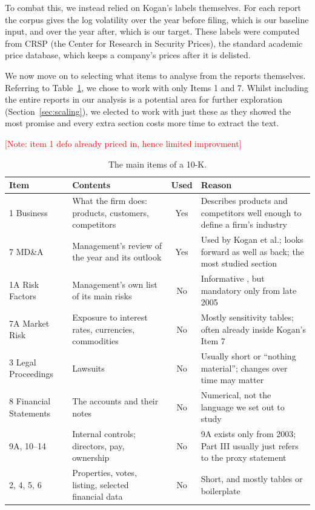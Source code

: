 \documentclass[11pt,a4paper]{article}
\newcommand{\placeholder}[1]{\textcolor{red}{[#1]}}
\begin{document}
To combat this, we instead relied on Kogan's labels themselves. For each report the corpus gives the log volatility over the year before filing, which is our baseline input, and over the year after, which is our target. These labels were computed from CRSP (the Center for Research in Security Prices), the standard academic price database, which keeps a company's prices after it is delisted.

We now move on to selecting what items to analyse from the reports themselves. Referring to Table~\ref{tab:items}, we chose to work with only Items 1 and 7. Whilst including the entire reports in our analysis is a potential area for further exploration (Section~\ref{sec:scaling}), we elected to work with just these as they showed the most promise and every extra section costs more time to extract the text.

\placeholder{Note: item 1 defo already priced in, hence limited improvment}

\begin{table}[ht]
  \centering
  \small
  \caption{The main items of a 10-K.}\label{tab:items}
  \begin{tabular}{@{}p{2.6cm}p{4.6cm}cp{7.6cm}@{}}
    \toprule
    Item & Contents & Used & Reason \\
    \midrule
    1 Business & What the firm does: products, customers, competitors & Yes & Describes products and competitors well enough to define a firm's industry \citep{hoberg2016} \\
    7 MD\&A & Management's review of the year and its outlook & Yes & Used by Kogan et al.; looks forward as well as back; the most studied section \citep{li2010,brown2011} \\
    1A Risk Factors & Management's own list of its main risks & No & Informative \citep{kravet2013}, but mandatory only from late 2005 \citep{sec2005} \\
    7A Market Risk & Exposure to interest rates, currencies, commodities & No & Mostly sensitivity tables; often already inside Kogan's Item 7 \\
    3 Legal Proceedings & Lawsuits & No & Usually short or ``nothing material''; changes over time may matter \citep{cohen2020} \\
    8 Financial Statements & The accounts and their notes & No & Numerical, not the language we set out to study \\
    9A, 10--14 & Internal controls; directors, pay, ownership & No & 9A exists only from 2003; Part III usually just refers to the proxy statement \\
    2, 4, 5, 6 & Properties, votes, listing, selected financial data & No & Short, and mostly tables or boilerplate \\
    \bottomrule
  \end{tabular}
\end{table}
\end{document}
